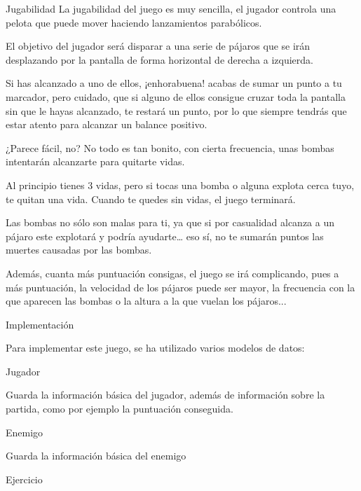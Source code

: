 Jugabilidad La jugabilidad del juego es muy sencilla, el jugador controla una pelota que puede mover haciendo lanzamientos parabólicos.

El objetivo del jugador será disparar a una serie de pájaros que se irán desplazando por la pantalla de forma horizontal de derecha a izquierda.

Si has alcanzado a uno de ellos, ¡enhorabuena! acabas de sumar un punto a tu marcador, pero cuidado, que si alguno de ellos consigue cruzar toda la pantalla sin que le hayas alcanzado, te restará un punto, por lo que siempre tendrás que estar atento para alcanzar un balance positivo.

¿\+Parece fácil, no? No todo es tan bonito, con cierta frecuencia, unas bombas intentarán alcanzarte para quitarte vidas.

Al principio tienes 3 vidas, pero si tocas una bomba o alguna explota cerca tuyo, te quitan una vida. Cuando te quedes sin vidas, el juego terminará.

Las bombas no sólo son malas para ti, ya que si por casualidad alcanza a un pájaro este explotará y podría ayudarte… eso sí, no te sumarán puntos las muertes causadas por las bombas.

Además, cuanta más puntuación consigas, el juego se irá complicando, pues a más puntuación, la velocidad de los pájaros puede ser mayor, la frecuencia con la que aparecen las bombas o la altura a la que vuelan los pájaros...

Implementación

Para implementar este juego, se ha utilizado varios modelos de datos\+:


\begin{DoxyEnumerate}
\item Jugador
\end{DoxyEnumerate}

Guarda la información básica del jugador, además de información sobre la partida, como por ejemplo la puntuación conseguida.


\begin{DoxyEnumerate}
\item Enemigo
\end{DoxyEnumerate}

Guarda la información básica del enemigo


\begin{DoxyEnumerate}
\item Ejercicio
\end{DoxyEnumerate}

